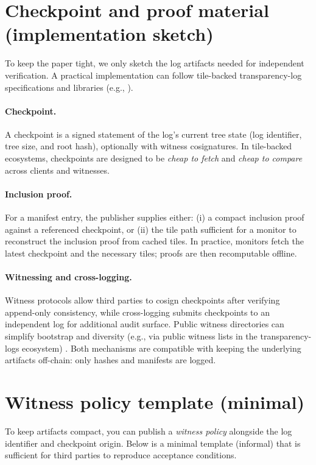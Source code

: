\documentclass[11pt]{article}
\begin{document}
\appendix
\section{Checkpoint and proof material (implementation sketch)}
To keep the paper tight, we only sketch the log artifacts needed for independent verification.
A practical implementation can follow tile-backed transparency-log specifications and libraries (e.g., \cite{c2sp_tlog_checkpoint,c2sp_tlog_tiles,c2sp_tlog_proof,c2sp_tlog_witness,tessera_github}).

\paragraph{Checkpoint.}
A checkpoint is a signed statement of the log's current tree state (log identifier, tree size, and root hash), optionally with witness cosignatures.
In tile-backed ecosystems, checkpoints are designed to be \emph{cheap to fetch} and \emph{cheap to compare} across clients and witnesses.

\paragraph{Inclusion proof.}
For a manifest entry, the publisher supplies either:
(i) a compact inclusion proof against a referenced checkpoint, or
(ii) the tile path sufficient for a monitor to reconstruct the inclusion proof from cached tiles.
In practice, monitors fetch the latest checkpoint and the necessary tiles; proofs are then recomputable offline.

\paragraph{Witnessing and cross-logging.}
Witness protocols allow third parties to cosign checkpoints after verifying append-only consistency, while cross-logging submits checkpoints to an independent log for additional audit surface. Public witness directories can simplify bootstrap and diversity (e.g., via public witness lists in the transparency-logs ecosystem) \cite{c2sp_tlog_witness}.
Both mechanisms are compatible with keeping the underlying artifacts off-chain: only hashes and manifests are logged.


\section{Witness policy template (minimal)}
To keep artifacts compact, you can publish a \emph{witness policy} alongside the log identifier and checkpoint origin.
Below is a minimal template (informal) that is sufficient for third parties to reproduce acceptance conditions.
\end{document}
